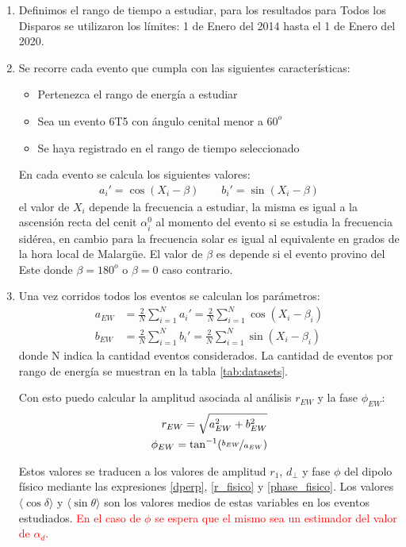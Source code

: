 \begin{enumerate}
    \item Definimos el rango de tiempo a estudiar, para los resultados para Todos los Disparos se utilizaron los límites: 1 de Enero del 2014 hasta el 1 de Enero del 2020.
    \item Se recorre cada evento que cumpla con las siguientes características:
     \begin{itemize}
        \item Pertenezca el rango de energía a estudiar
        \item Sea un evento 6T5 con ángulo cenital menor a $60^o$
        \item Se haya registrado en el rango de tiempo seleccionado
    \end{itemize}
    En cada evento se calcula los siguientes valores:
    \begin{align}
        a_i' = \cos(X_i - \beta) \qquad
        b_i' = \sin(X_i - \beta)
    \end{align}
    el valor de $X_i$ depende la frecuencia a estudiar, la misma es igual a la ascensión recta del cenit $\alpha^0_i$ al momento del evento  si se estudia la frecuencia sidérea, en cambio para la frecuencia solar es igual al equivalente en grados de la hora local de Malargüe. El valor de $\beta$ es depende si el evento provino del Este donde $\beta=180^o$ o $\beta=0$ caso contrario.
    
    \item Una vez corridos todos los  eventos se calculan los parámetros:
    \begin{align*}
        a_{EW} &= \frac{2}{N} \sum^N_{i=1}a_i' =\frac{2}{N} \sum^N_{i=1} \cos(X_i - \beta_i)\\
        b_{EW} &= \frac{2}{N} \sum^N_{i=1}b_i' =\frac{2}{N} \sum^N_{i=1} \sin(X_i - \beta_i)
    \end{align*}
    donde N indica la cantidad eventos considerados. La cantidad de eventos por rango de energía se muestran en la tabla \ref{tab:datasets}.

    Con esto puedo calcular la amplitud asociada al análisis $r_{EW}$ y la fase $\phi_{EW}$:
    \begin{align*}
        r_{EW} = \sqrt{a_{EW}^2 + b_{EW}^2}\\
        \phi_{EW} = \tan^{-1}(\nicefrac{b_{EW}}{a_{EW}})
    \end{align*}

    Estos valores se traducen a los valores de amplitud $r_1$, $d_\perp$ y fase $\phi$ del dipolo físico mediante las expresiones \ref{dperp}, \ref{r_fisico} y \ref{phase_fisico}.   Los valores $\langle\cos\delta \rangle$ y $\langle\sin\theta \rangle$ son los valores medios de estas variables en los eventos estudiados. \textcolor{red}{En el caso de $\phi$ se espera que el mismo sea un estimador del valor de $\alpha_d$.}


\end{enumerate}
